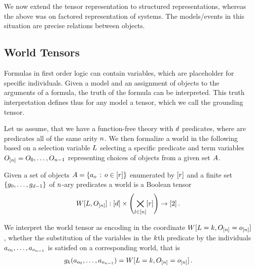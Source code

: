 \section{\chatextfolModels}\label{cha:folModels}

We now extend the tensor representation to structured representations, whereas the above was on factored representation of systems.
The models/events in this situation are precise relations between objects.





%
\subsection{World Tensors}


Formulas in first order logic can contain variables, which are placeholder for specific individuals.
Given a model and an assignment of objects to the arguments of a formula, the truth of the formula can be interpreted.
This truth interpretation defines thus for any model a tensor, which we call the grounding tensor.

Let us assume, that we have a function-free theory with $d$ predicates, where are predicates all of the same arity $n$.
We then formalize a world in the following based on a selection variable $L$ selecting a specific predicate and term variables $O_{[n]}=O_{0},\ldots,O_{n-1}$ representing choices of objects from a given set $A$.

\begin{definition}
	Given a set of objects $A=\{a_{o} \, : \, o\in[r]\}$ enumerated by $[r]$ and a finite set $\{g_{0},\ldots,g_{d-1}\}$ of $n$-ary predicates a world is a Boolean tensor
	\begin{align}
		W[L,O_{[n]}] : [d] \times \left( \bigtimes_{l\in[n]} [r] \right) \rightarrow [2] \, . 
	\end{align}
	
	We interpret the world tensor as encoding in the coordinate $W[L=k,O_{[n]}=o_{[n]}]$, whether the substitution of the variables in the $k$th predicate by the individuals $a_{o_{0}},\ldots,a_{o_{n-1}}$ is satisfed on a corresponding world, that is
	\begin{align*}
		g_{k}(a_{o_{0}},\ldots,a_{o_{n-1}}) = W[L=k,O_{[n]}=o_{[n]}] \, . 
	\end{align*}
\end{definition}


